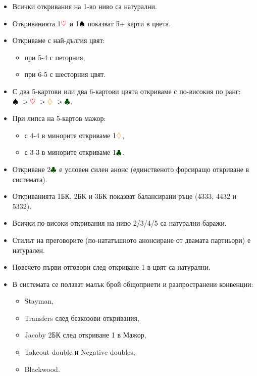\documentclass[10pt,a5paper]{extarticle}
\newcommand{\Rheart}{\textcolor{red}{\heartsuit}}
\newcommand{\Rdiamond}{\textcolor{orange}{\diamondsuit}}
\newcommand{\Bspade}{\textcolor{black}{\spadesuit}}
\newcommand{\Bclub}{\textcolor{darkgreen}{\clubsuit}}
\begin{document}
\begin{itemize}
    \item[] Всички откривания на 1-во ниво са натурални.
    \item[] Откриванията 1$\Rheart$ и 1$\Bspade$ показват 5+ карти в цвета.
    \item[] Откриваме с най-дългия цвят:
        \begin{itemize}
            \item[] при 5-4 с петорния,
            \item[] при 6-5 с шесторния цвят.
        \end{itemize}
    \item[] С два 5-картови или два 6-картови цвята откриваме с по-високия по ранг: $\Bspade\ > \Rheart\ > \Rdiamond\ > \Bclub$.
    \item[] При липса на 5-картов мажор:
        \begin{itemize}
            \item[] с 4-4 в минорите откриваме 1$\Rdiamond$,
            \item[] с 3-3 в минорите откриваме 1$\Bclub$.
        \end{itemize}
    \item[] Откриване 2$\Bclub$ е условен силен анонс (единственото форсиращо откриване в системата).
    \item[] Откриванията 1БК, 2БК и 3БК показват балансирани ръце (4333, 4432 и 5332).
    \item[] Всички по-високи откривания на ниво 2/3/4/5 са натурални баражи.
    \item[] Стилът на преговорите (по-нататъшното анонсиране от двамата партньори) е натурален.
    \item[] Повечето първи отговори след откриване 1 в цвят са натурални.
    \item[] В системата се ползват малък брой общоприети и разпространени конвенции:
        \begin{itemize}
            \item[] Stayman,
            \item[] Transfers след безкозови откривания,
            \item[] Jacoby 2БК след откриване 1 в Мажор,
            \item[] Takeout double и Negative doubles,
            \item[] Blackwood.
        \end{itemize}
\end{itemize}
\end{document}
